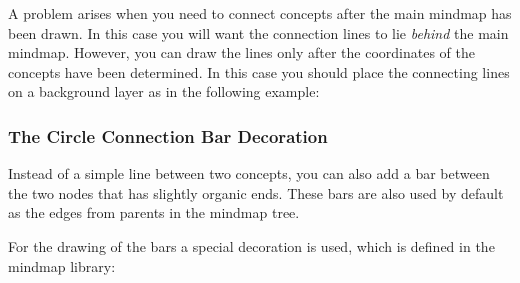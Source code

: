 A problem arises when you need to connect concepts after the main mindmap has
been drawn. In this case you will want the connection lines to lie
\emph{behind} the main mindmap. However, you can draw the lines only after the
coordinates of the concepts have been determined. In this case you should place
the connecting lines on a background layer as in the following example:

\begin{codeexample}[preamble={\usetikzlibrary{backgrounds,mindmap}}]
\end{codeexample}


\subsubsection{The Circle Connection Bar Decoration}

Instead of a simple line between two concepts, you can also add a bar between
the two nodes that has slightly organic ends. These bars are also used by
default as the edges from parents in the mindmap tree.

For the drawing of the bars a special decoration is used, which is defined in
the mindmap library:


